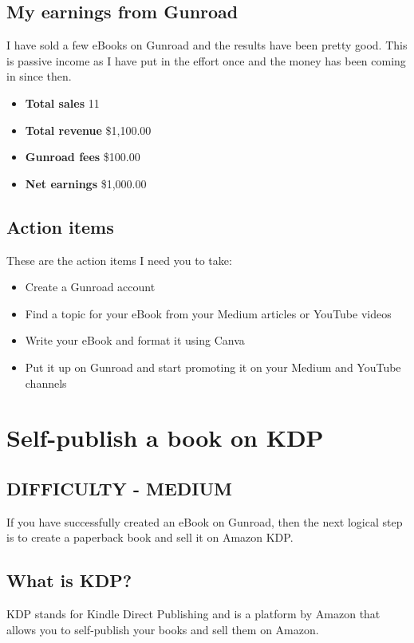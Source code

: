 \documentclass[11pt]{article}
\begin{document}
\subsection*{My earnings from Gunroad}
I have sold a few eBooks on Gunroad and the results have been pretty good. This is passive income as I have put in the effort once and the money has been coming in since then.

\begin{itemize}
\item \textbf{Total sales} 11
\item \textbf{Total revenue} \$1,100.00
\item \textbf{Gunroad fees} \$100.00
\item \textbf{Net earnings} \$1,000.00
\end{itemize}

\subsection*{Action items}
These are the action items I need you to take:

\begin{itemize}
\item Create a Gunroad account
\item Find a topic for your eBook from your Medium articles or YouTube videos
\item Write your eBook and format it using Canva
\item Put it up on Gunroad and start promoting it on your Medium and YouTube channels
\end{itemize}

\section*{Self-publish a book on KDP}
\subsection*{DIFFICULTY - MEDIUM}
If you have successfully created an eBook on Gunroad, then the next logical step is to create a paperback book and sell it on Amazon KDP.

\subsection*{What is KDP?}
KDP stands for Kindle Direct Publishing and is a platform by Amazon that allows you to self-publish your books and sell them on Amazon.
\end{document}
